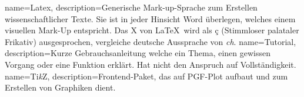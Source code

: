 %
{%
	name=Latex,%
	description={Generische Mark-up-Sprache zum Erstellen wissenschaftlicher Texte. Sie ist in jeder Hinsicht Word überlegen, welches einem visuellen Mark-Up entspricht. Das X von \LaTeX\ wird als ç (Stimmloser palataler Frikativ) ausgesprochen, vergleiche deutsche Aussprache von \textit{ch}.}%
}%
%
{%
	name=Tutorial,%
	description={Kurze Gebrauchsanleitung welche ein Thema, einen gewissen Vorgang oder eine Funktion erklärt. Hat nicht den Anspruch auf Vollständigkeit.}%
}%
%
{%
	name=Ti\textit{k}Z,%
	description={Frontend-Paket, das auf PGF-Plot aufbaut und zum Erstellen von Graphiken dient.}%
}%
